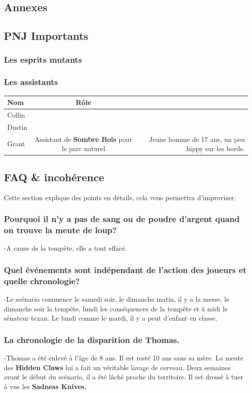 \documentclass[oneside,12pt]{book}
\newcommand{\Leonard}{\textbf{Sombre Bois} }
\begin{document}
\begin{flushleft}
\chapter{Annexes}
\section{PNJ Importants}
\subsection{Les esprits mutants}
\label{esprit_mutant}

\subsection{Les assistants}
\begin{tabular}{|l|c|r|}
\hline
Nom & Rôle \\
\hline
Collin &  & \\
Dustin &  & \\
Grant & Assistant de \Leonard pour le parc naturel & Jeune homme de 17 ans, un peu hippy sur les bords.  \\
\hline
\end{tabular}

\clearpage

\section{FAQ \& incohérence}
Cette section explique des points en détails, cela vous permettra d'improviser.
\subsection{Pourquoi il n'y a pas de sang ou de poudre d'argent quand on trouve la meute de loup?}
-A cause de la tempête, elle a tout effacé. 
\subsection{Quel événements sont indépendant de l'action des joueurs et quelle chronologie?}
-Le scénario commence le samedi soir, le dimanche matin, il y a la messe, le dimanche soir la tempête, lundi les conséquences de la tempête et à midi le sénateur texan. Le lundi comme le mardi, il y a peut d'enfant en classe. 
\subsection{La chronologie de la disparition de Thomas.} 
-Thomas a été enlevé à l'âge de 8 ans. Il est resté 10 ans sans sa mère. La meute des \textbf{Hidden Claws} lui a fait un véritable lavage de cerveau. Deux semaines avant le début du scénario, il a été lâché proche du territoire. Il est dressé à tuer à vue les \textbf{Sadness Knives.}


\end{flushleft}
\end{document}

